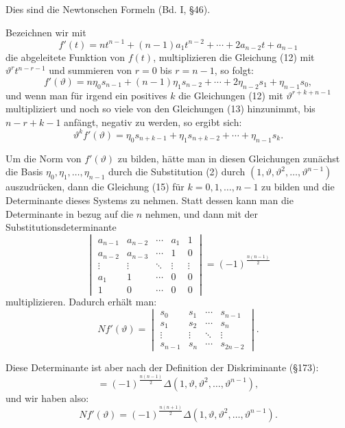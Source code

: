 \documentclass[12pt,a4paper]{article}
\theoremstyle{definition}
\begin{document}
Dies sind die Newtonschen Formeln (Bd. I, \S 46).

Bezeichnen wir mit
\[f'(t) = nt^{n-1} + (n-1)a_1t^{n-2} + \cdots + 2a_{n-2}t + a_{n-1}\]
die abgeleitete Funktion von $f(t)$, multiplizieren die Gleichung (12) mit $\vartheta^r t^{n-r-1}$ und summieren von $r = 0$ bis $r = n-1$, so folgt:
\begin{equation}
f'(\vartheta) = n\eta_0s_{n-1} + (n-1)\eta_1s_{n-2} + \cdots + 2\eta_{n-2}s_1 + \eta_{n-1}s_0,
\end{equation}
und wenn man für irgend ein positives $k$ die Gleichungen (12) mit $\vartheta^{r+k+n-1}$ multipliziert und noch so viele von den Gleichungen (13) hinzunimmt, bis $n - r + k - 1$ anfängt, negativ zu werden, so ergibt sich:
\begin{equation}
\vartheta^k f'(\vartheta) = \eta_0s_{n+k-1} + \eta_1s_{n+k-2} + \cdots + \eta_{n-1}s_k.
\end{equation}

Um die Norm von $f'(\vartheta)$ zu bilden, hätte man in diesen Gleichungen zunächst die Basis $\eta_0, \eta_1, \ldots, \eta_{n-1}$ durch die Substitution (2) durch $(1, \vartheta, \vartheta^2, \ldots, \vartheta^{n-1})$ auszudrücken, dann die Gleichung (15) für $k = 0, 1, \ldots, n-1$ zu bilden und die Determinante dieses Systems zu nehmen. Statt dessen kann man die Determinante in bezug auf die $n$ nehmen, und dann mit der Substitutionsdeterminante
\begin{equation}
\begin{vmatrix}
a_{n-1} & a_{n-2} & \cdots & a_1 & 1 \\
a_{n-2} & a_{n-3} & \cdots & 1 & 0 \\
\vdots & \vdots & \ddots & \vdots & \vdots \\
a_1 & 1 & \cdots & 0 & 0 \\
1 & 0 & \cdots & 0 & 0
\end{vmatrix}
= (-1)^{\frac{n(n-1)}{2}}
\end{equation}
multiplizieren. Dadurch erhält man:
\[Nf'(\vartheta) = \begin{vmatrix}
s_0 & s_1 & \cdots & s_{n-1} \\
s_1 & s_2 & \cdots & s_n \\
\vdots & \vdots & \ddots & \vdots \\
s_{n-1} & s_n & \cdots & s_{2n-2}
\end{vmatrix}.\]

Diese Determinante ist aber nach der Definition der Diskriminante (\S 173):
\[= (-1)^{\frac{n(n-1)}{2}} \Delta(1, \vartheta, \vartheta^2, \ldots, \vartheta^{n-1}),\]
und wir haben also:
\begin{equation}
Nf'(\vartheta) = (-1)^{\frac{n(n+1)}{2}} \Delta(1, \vartheta, \vartheta^2, \ldots, \vartheta^{n-1}).
\end{equation}
\end{document}
